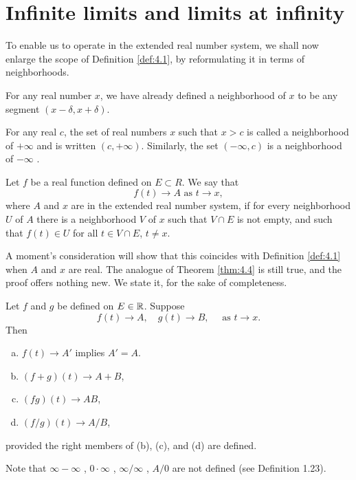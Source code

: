 \section{Infinite limits and limits at infinity}
To enable us to operate in the extended real number system, 
we shall now enlarge the scope of Definition \ref{def:4.1}, 
by reformulating it in terms of neighborhoods.

For any real number $x$, we have already defined a neighborhood of $x$ to
be any segment $(x - \delta, x + \delta)$.

\begin{mydef}
    \label{def:4.32}
    For any real $c$, the set of real numbers $x$ such that $x > c$ 
    is called a neighborhood of $+\infty$ and is written $(c, +\infty)$. 
    Similarly, the set $(-\infty , c)$ is a neighborhood of $-\infty$ .
\end{mydef}

\begin{mydef}
    \label{def:4.33}
    Let $f$ be a real function defined on $E \subset R$. 
    We say that 
    \begin{equation*}
        f(t) \rightarrow A \text{ as } t \rightarrow x,
    \end{equation*}
    where $A$ and $x$ are in the extended real number system, 
    if for every neighborhood $U$ of $A$ 
    there is a neighborhood $V$ of $x$ 
    such that $V \cap E$ is not empty, 
    and such that $f(t) \in U$ for all $t \in V \cap E$, $t \neq x$.
    
    A moment's consideration will show that 
    this coincides with Definition \ref{def:4.1} when $A$ and $x$ are real.
    The analogue of Theorem \ref{thm:4.4} is still true, 
    and the proof offers nothing new. 
    We state it, for the sake of completeness.
\end{mydef}

\begin{thm}
    \label{thm:4.34}
    Let $f$ and $g$ be defined on $E \in {\protect\mathbb R}$. Suppose
    \begin{equation*}
        f(t) \rightarrow A, \quad
        g(t) \rightarrow B, \quad
        \text{ as } t \rightarrow x.
    \end{equation*}
    Then
\begin{enumerate}[(a)]
    \item $f(t) \rightarrow A'$ implies $A' = A$.
    \item $(f + g)(t) \rightarrow A + B$,
    \item $(fg)(t) \rightarrow AB$,
    \item $(f /g)(t) \rightarrow A/B$,
\end{enumerate}
provided the right members of (b), (c), and (d) are defined.
\end{thm}

Note that $\infty  - \infty$ , $0 \cdot \infty$ , $\infty /\infty$ , 
$A/0$ are not defined (see Definition 1.23).